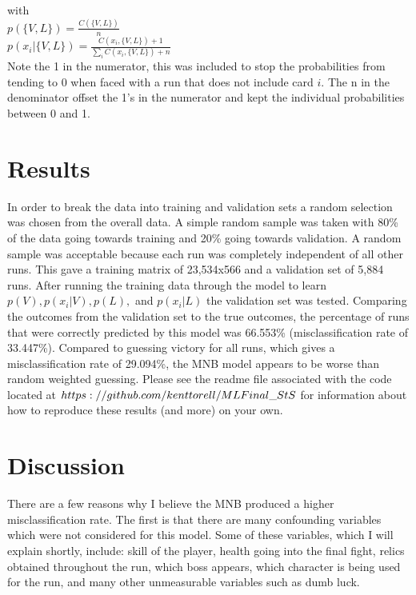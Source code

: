 \documentclass[10pt, a4paper, twocolumn]{article}
\begin{document}
with\\

$p(\{V,L\}) =  \frac{C(\{V,L\})}{n}$\\

$p(x_i|\{V,L\}) =\frac{ C(x_i,\{V,L\}) + 1}{\sum_i C(x_i,\{V,L\})+n}$\\

Note the 1 in the numerator, this was included to stop the probabilities from tending to 0 when faced with a run that does not include card $i$.  The n in the denominator offset the 1’s in the numerator and kept the individual probabilities between 0 and 1.

\section{Results}

In order to break the data into training and validation sets a random selection was chosen from the overall data.  A simple random sample was taken with 80\% of the data going towards training and 20\% going towards validation.  A random sample was acceptable because each run was completely independent of all other runs.  This gave a training matrix of 23,534x566 and a validation set of 5,884 runs.
	After running the training data through the model to learn $p(V), p(x_i|V), p(L),$ and $p(x_i|L)$ the validation set was tested.  Comparing the outcomes from the validation set to the true outcomes, the percentage of runs that were correctly predicted by this model was 66.553\% (misclassification rate of 33.447\%).  Compared to guessing victory for all runs, which gives a misclassification rate of 29.094\%, the MNB model appears to be worse than random weighted guessing.
	Please see the readme file associated with the code located at $\small{https://github.com/kenttorell/MLFinal\_StS}$ for information about how to reproduce these results (and more) on your own.

\section{Discussion}
	There are a few reasons why I believe the MNB produced a higher misclassification rate.  The first is that there are many confounding variables which were not considered for this model.  Some of these variables, which I will explain shortly, include: skill of the player, health going into the final fight, relics obtained throughout the run, which boss appears, which character is being used for the run, and many other unmeasurable variables such as dumb luck.
\end{document}
